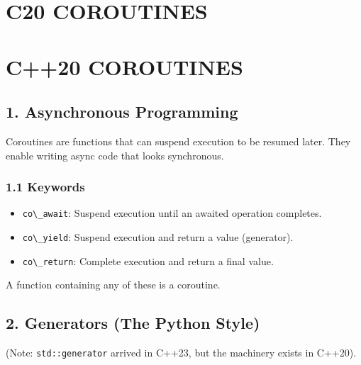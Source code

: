 \hypertarget{c20-coroutines}{%
\chapter{C20 COROUTINES}\label{c20-coroutines}}

\hypertarget{c20-coroutines-1}{%
\chapter{C++20 COROUTINES}\label{c20-coroutines-1}}

\hypertarget{asynchronous-programming}{%
\section{1. Asynchronous Programming}\label{asynchronous-programming}}

Coroutines are functions that can suspend execution to be resumed later.
They enable writing async code that looks synchronous.

\hypertarget{keywords}{%
\subsection{1.1 Keywords}\label{keywords}}

\begin{itemize}
\tightlist
\item
  \passthrough{\lstinline!co\_await!}: Suspend execution until an
  awaited operation completes.
\item
  \passthrough{\lstinline!co\_yield!}: Suspend execution and return a
  value (generator).
\item
  \passthrough{\lstinline!co\_return!}: Complete execution and return a
  final value.
\end{itemize}

A function containing any of these is a coroutine.

\hypertarget{generators-the-python-style}{%
\section{2. Generators (The Python
Style)}\label{generators-the-python-style}}

(Note: \passthrough{\lstinline!std::generator!} arrived in C++23, but
the machinery exists in C++20).

